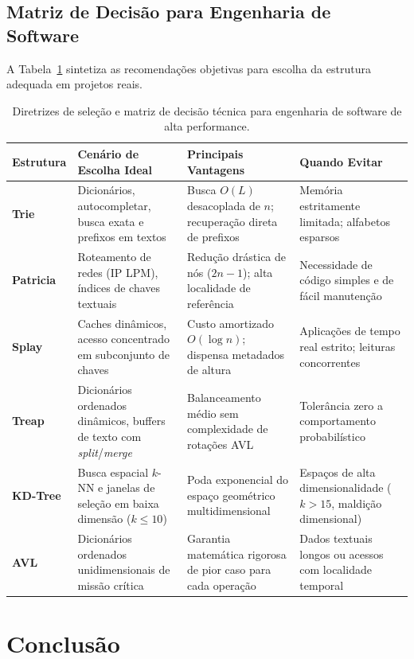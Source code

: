 \documentclass[11pt,a4paper]{article}
\newcommand{\Ogrande}[1]{\ensuremath{O\!\left(#1\right)}}
\begin{document}
\subsection{Matriz de Decisão para Engenharia de Software}
A Tabela~\ref{tab:decisao} sintetiza as recomendações objetivas para escolha da estrutura adequada em projetos reais.

\begin{table}[htbp]
\centering
\caption{Diretrizes de seleção e matriz de decisão técnica para engenharia de software de alta performance.}
\label{tab:decisao}
\scriptsize
\renewcommand{\arraystretch}{0.88}
\setlength{\tabcolsep}{2pt}
\begin{tabularx}{\linewidth}{>{\bfseries}l p{3.6cm} p{4.2cm} X}
\toprule
Estrutura & Cenário de Escolha Ideal & Principais Vantagens & Quando Evitar \\
\midrule
Trie & Dicionários, autocompletar, busca exata e prefixos em textos & Busca $\Ogrande{L}$ desacoplada de $n$; recuperação direta de prefixos & Memória estritamente limitada; alfabetos esparsos \\
Patricia & Roteamento de redes (IP LPM), índices de chaves textuais & Redução drástica de nós ($2n-1$); alta localidade de referência & Necessidade de código simples e de fácil manutenção \\
Splay & Caches dinâmicos, acesso concentrado em subconjunto de chaves & Custo amortizado $\Ogrande{\log n}$; dispensa metadados de altura & Aplicações de tempo real estrito; leituras concorrentes \\
Treap & Dicionários ordenados dinâmicos, buffers de texto com \textit{split}/\textit{merge} & Balanceamento médio sem complexidade de rotações AVL & Tolerância zero a comportamento probabilístico \\
KD-Tree & Busca espacial $k$-NN e janelas de seleção em baixa dimensão ($k \le 10$) & Poda exponencial do espaço geométrico multidimensional & Espaços de alta dimensionalidade ($k > 15$, maldição dimensional) \\
AVL & Dicionários ordenados unidimensionais de missão crítica & Garantia matemática rigorosa de pior caso para cada operação & Dados textuais longos ou acessos com localidade temporal \\
\bottomrule
\end{tabularx}
\end{table}

\section{Conclusão}
\end{document}
